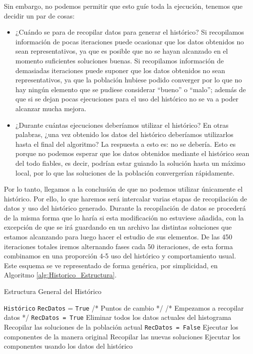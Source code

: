 Sin embargo, no podemos permitir que esto guíe toda la ejecución, tenemos que decidir un par de cosas:
\begin{itemize}
	\item ¿Cuándo se para de recopilar datos para generar el histórico? 
	Si recopilamos información de pocas iteraciones puede ocasionar que los datos obtenidos no sean representativos, ya que es posible que no se hayan alcanzado en el momento suficientes soluciones buenas. 
	Si recopilamos información de demasiadas iteraciones puede suponer que los datos obtenidos no sean representativos, ya que la población hubiese podido converger por lo que no hay ningún elemento que se pudiese considerar ``bueno'' o ``malo''; además de que si se dejan pocas ejecuciones para el uso del histórico no se va a poder alcanzar mucha mejora. 
	\item ¿Durante cuántas ejecuciones deberíamos utilizar el histórico? 
	En otras palabras, ¿una vez obtenido los datos del histórico deberíamos utilizarlos hasta el final del algoritmo? 
	La respuesta a esto es: no se debería. 
	Esto es porque no podemos esperar que los datos obtenidos mediante el histórico sean del todo fiables, es decir, podrían estar guiando la solución hasta un máximo local, por lo que las soluciones de la población convergerían rápidamente. 
\end{itemize}

Por lo tanto, llegamos a la conclusión de que no podemos utilizar únicamente el histórico. 
Por ello, lo que haremos será intercalar varias etapas de recopilación de datos y uso del histórico generado. 
Durante la recopilación de datos se procederá de la misma forma que lo haría si esta modificación no estuviese añadida, con la excepción de que se irá guardando en un archivo las distintas soluciones que estamos alcanzando para luego hacer el estudio de sus elementos. 
De las 450 iteraciones totales iremos alternando fases cada 50 iteraciones, de esta forma combinamos en una proporción 4-5 uso del histórico y comportamiento usual. 
Este esquema se ve representado de forma genérica, por simplicidad, en Algoritmo \ref{alg:Historico_Estructura}.

\begin{algorithm}
\caption{Estructura General del Histórico}\label{alg:Historico_Estructura}
\begin{algorithmic}[1]
\Procedure \texttt{Histórico}
\State \texttt{RecDatos} = \texttt{True}
	 /* Puntos de cambio */
		 /* Empezamos a recopilar datos */
			\State \texttt{RecDatos = True}
			\State Eliminar todos los datos actuales del histograma
			\State Recopilar las soluciones de la población actual
		\Else
			\State \texttt{RecDatos = False}
		\EndIf
	\EndIf
		\State Ejecutar los componentes de la manera original
		\State Recopilar las nuevas soluciones
	\Else 
		\State Ejecutar los componentes usando los datos del histórico
	\EndIf
\EndFor
\EndProcedure
\end{algorithmic}
\end{algorithm}

